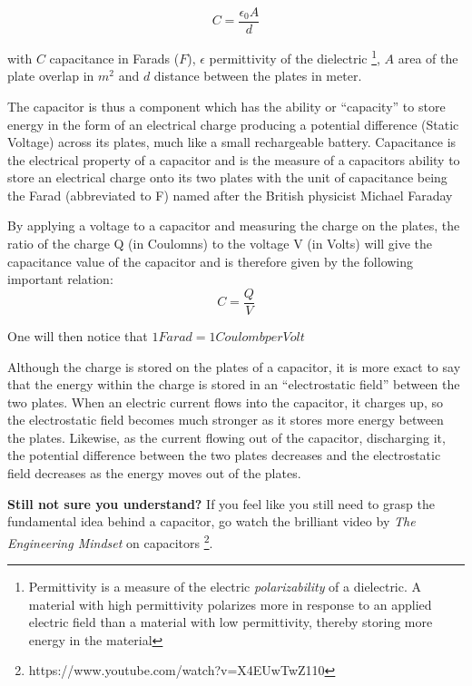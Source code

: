 \begin{equation}
    C = \frac{\epsilon_0 A}{d}
\end{equation}

with $C$ capacitance in Farads ($F$), $\epsilon$ permittivity of the dielectric \footnote{Permittivity is a measure of the electric \textit{polarizability} of a dielectric. A material with high permittivity polarizes more in response to an applied electric field than a material with low permittivity, thereby storing more energy in the material}, $A$ area of the plate overlap in $m^2$ and $d$ distance between the plates in meter. 

The capacitor is thus a component which has the ability or “capacity” to store energy in the form of an electrical charge producing a potential difference (Static Voltage) across its plates, much like a small rechargeable battery.
Capacitance is the electrical property of a capacitor and is the measure of a capacitors ability to store an electrical charge onto its two plates with the unit of capacitance being the Farad (abbreviated to F) named after the British physicist Michael Faraday

By applying a voltage to a capacitor and measuring the charge on the plates, the ratio of the charge Q (in Coulomns) to the voltage V (in Volts) will give the capacitance value of the capacitor and is therefore given by the following important relation: 
\begin{equation*}
    C = \frac{Q}{V}
\end{equation*}

One will then notice that $1 Farad = 1 Coulomb per Volt$

Although the charge is stored on the plates of a capacitor, it is more exact to say that the energy within the charge is stored in an “electrostatic field” between the two plates. When an electric current flows into the capacitor, it charges up, so the electrostatic field becomes much stronger as it stores more energy between the plates. Likewise, as the current flowing out of the capacitor, discharging it, the potential difference between the two plates decreases and the electrostatic field decreases as the energy moves out of the plates.

\textbf{Still not sure you understand?} If you feel like you still need to grasp the fundamental idea behind a capacitor, go watch the brilliant video by \textit{The Engineering Mindset} on capacitors \footnote{https://www.youtube.com/watch?v=X4EUwTwZ110}.

